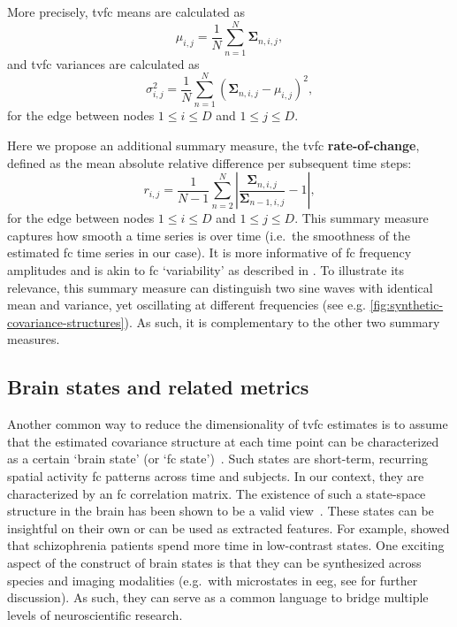 More precisely, \gls{tvfc} means are calculated as
\begin{equation}
  \mu_{i,j} = \frac{1}{N} \sum_{n=1}^N \mathbf{\Sigma}_{n,i,j},
\end{equation}
and \gls{tvfc} variances are calculated as
\begin{equation}
  \sigma^2_{i,j} = \frac{1}{N} \sum_{n=1}^N (\mathbf{\Sigma}_{n,i,j} - \mu_{i,j})^2,
\end{equation}
for the edge between nodes $1 \leq i \leq D$ and $1 \leq j \leq D$.

Here we propose an additional summary measure, the \gls{tvfc} \textbf{rate-of-change}, defined as the mean absolute relative difference per subsequent time steps:
\begin{equation}
  r_{i,j} = \frac{1}{N-1} \sum_{n=2}^N | \frac{\mathbf{\Sigma}_{n,i,j}}{\mathbf{\Sigma}_{n-1,i,j}} - 1 |,
\end{equation}
for the edge between nodes $1 \leq i \leq D$ and $1 \leq j \leq D$.
This summary measure captures how smooth a time series is over time (i.e.~the smoothness of the estimated \gls{fc} time series in our case).
It is more informative of \gls{fc} frequency amplitudes and is akin to \gls{fc} `variability' as described in \textcite{Allen2014}.
To illustrate its relevance, this summary measure can distinguish two sine waves with identical mean and variance, yet oscillating at different frequencies (see e.g. \cref{fig:synthetic-covariance-structures}).
As such, it is complementary to the other two summary measures.

\subsection{Brain states and related metrics}\label{subsec:brain-states}

Another common way to reduce the dimensionality of \gls{tvfc} estimates is to assume that the estimated covariance structure at each time point can be characterized as a certain `brain state' (or `\gls{fc} state')~\parencite{Kringelbach2020}.
Such states are short-term, recurring spatial activity \gls{fc} patterns across time and subjects.
In our context, they are characterized by an \gls{fc} correlation matrix.
%
The existence of such a state-space structure in the brain has been shown to be a valid view~\parencite{Deco2015}.
%
These states can be insightful on their own or can be used as extracted features.
For example, \textcite{Rashid2016} showed that schizophrenia patients spend more time in low-contrast states.
One exciting aspect of the construct of brain states is that they can be synthesized across species and imaging modalities (e.g.~with microstates in \gls{eeg}, see \textcite{Allen2014} for further discussion).
As such, they can serve as a common language to bridge multiple levels of neuroscientific research.


